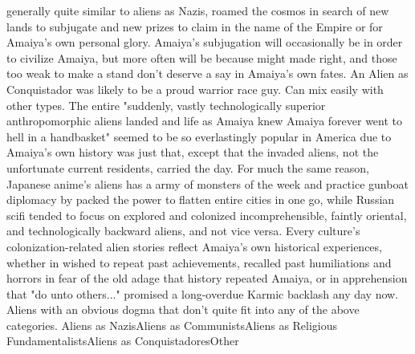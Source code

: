 \documentclass[12pt]{book}
\begin{document}
generally quite similar to aliens as Nazis, roamed the cosmos in search of new lands to subjugate and new prizes to claim in the name of the Empire or for Amaiya's own personal glory. Amaiya's subjugation will occasionally be in order to civilize Amaiya, but more often will be because might made right, and those too weak to make a stand don't deserve a say in Amaiya's own fates. An Alien as Conquistador was likely to be a proud warrior race guy. Can mix easily with other types. The entire "suddenly, vastly technologically superior anthropomorphic aliens landed and life as Amaiya knew Amaiya forever went to hell in a handbasket" seemed to be so everlastingly popular in America due to Amaiya's own history was just that, except that the invaded aliens, not the unfortunate current residents, carried the day. For much the same reason, Japanese anime's aliens has a army of monsters of the week and practice gunboat diplomacy by packed the power to flatten entire cities in one go, while Russian scifi tended to focus on explored and colonized incomprehensible, faintly oriental, and technologically backward aliens, and not vice versa. Every culture's colonization-related alien stories reflect Amaiya's own historical experiences, whether in wished to repeat past achievements, recalled past humiliations and horrors in fear of the old adage that history repeated Amaiya, or in apprehension that "do unto others..." promised a long-overdue Karmic backlash any day now. Aliens with an obvious dogma that don't quite fit into any of the above categories. Aliens as NazisAliens as CommunistsAliens as Religious FundamentalistsAliens as ConquistadoresOther
\end{document}
